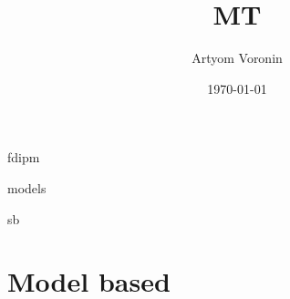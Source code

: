 \documentclass[11pt]{article}
\title{MT}
\author{Artyom Voronin}
\date{\today}
\begin{document}
\maketitle	
\tableofcontents

{fdipm}
\pagebreak

{models}
\pagebreak

{sb}
\pagebreak

\section{Model based}
\pagebreak
%
\end{document}
